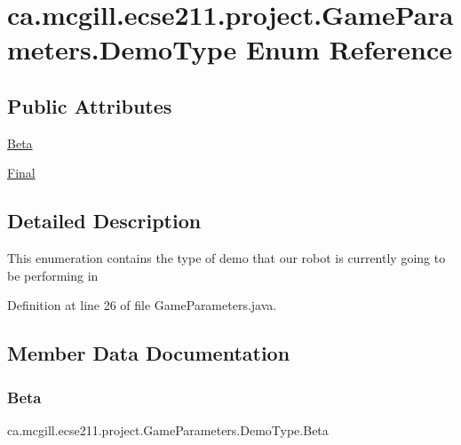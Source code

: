 \hypertarget{enumca_1_1mcgill_1_1ecse211_1_1project_1_1_game_parameters_1_1_demo_type}{}\section{ca.\+mcgill.\+ecse211.\+project.\+Game\+Parameters.\+Demo\+Type Enum Reference}
\label{enumca_1_1mcgill_1_1ecse211_1_1project_1_1_game_parameters_1_1_demo_type}
\subsection*{Public Attributes}
\begin{DoxyCompactItemize}
\item 
\hyperlink{enumca_1_1mcgill_1_1ecse211_1_1project_1_1_game_parameters_1_1_demo_type_a8d4e576df991cb52b50ae54b2812aa7f}{Beta}
\item 
\hyperlink{enumca_1_1mcgill_1_1ecse211_1_1project_1_1_game_parameters_1_1_demo_type_a1ba3e060bfd5f76af77b713321abc7f6}{Final}
\end{DoxyCompactItemize}


\subsection{Detailed Description}
This enumeration contains the type of demo that our robot is currently going to be performing in 

Definition at line 26 of file Game\+Parameters.\+java.



\subsection{Member Data Documentation}
\mbox{\label{enumca_1_1mcgill_1_1ecse211_1_1project_1_1_game_parameters_1_1_demo_type_a8d4e576df991cb52b50ae54b2812aa7f}} 
\subsubsection{\texorpdfstring{Beta}{Beta}}
{\footnotesize\ttfamily ca.\+mcgill.\+ecse211.\+project.\+Game\+Parameters.\+Demo\+Type.\+Beta}



